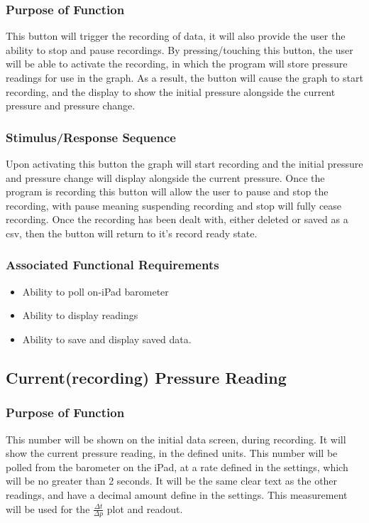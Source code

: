\documentclass[onecolumn, draftclsnofoot,10pt, compsoc]{IEEEtran}
\begin{document}
\subsubsection{Purpose of Function}
This button will trigger the recording of data, it will also provide the user the ability to stop and pause recordings.
By pressing/touching this button, the user will be able to activate the recording, in which the program will store pressure readings for use in the graph.
As a result, the button will cause the graph to start recording, and the display to show the initial pressure alongside the current pressure and pressure change.
\subsubsection{Stimulus/Response Sequence}
Upon activating this button the graph will start recording and the initial pressure and pressure change will display alongside the current pressure.
Once the program is recording this button will allow the user to pause and stop the recording, with pause meaning suspending recording and stop will fully cease recording.
Once the recording has been dealt with, either deleted or saved as a csv, then the button will return to it's record ready state.
\subsubsection{Associated Functional Requirements}
\begin{itemize}
\item Ability to poll on-iPad barometer
\item Ability to display readings
\item Ability to save and display saved data.
\end{itemize}

\subsection{Current(recording) Pressure Reading}
\subsubsection{Purpose of Function}
This number will be shown on the initial data screen, during recording.
It will show the current pressure reading, in the defined units.
This number will be polled from the barometer on the iPad, at a rate defined in the settings, which will be no greater than 2 seconds.
It will be the same clear text as the other readings, and have a decimal amount define in the settings.
This measurement will be used for the $\frac{\Delta t}{\Delta p}$ plot and readout.
\end{document}
